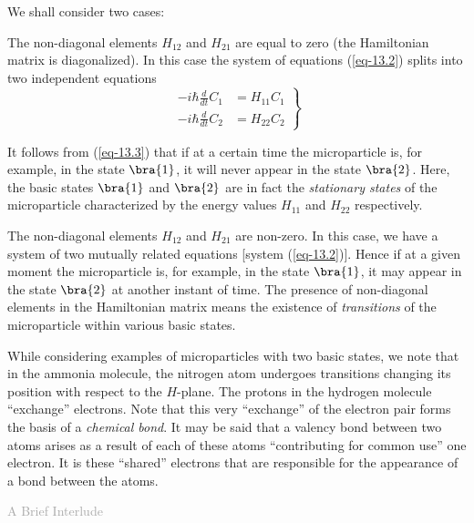 \documentclass[a4paper,sfsidenotes,colorlinks=true]{tufte-book}
\numberwithin{equation}{section}
\numberwithin{figure}{section}
\begin{document}
We shall consider two cases: 
\\[5pt]
\begin{description}[leftmargin=1cm]
\item[First case.] The non-diagonal elements $H_{12}$ and $H_{21}$ are
  equal to zero (the Hamiltonian matrix is diagonalized). In this case
  the system of equations (\ref{eq-13.2}) splits into two independent
  equations
\begin{equation}%
\left.
\begin{split}
- i \hbar \frac{d}{dt} C_{1} & = H_{11}C_{1}  \\
- i \hbar \frac{d}{dt} C_{2} & = H_{22} C_{2} 
\end{split}
\right\}
\label{eq-13.3}
\end{equation}

It follows from (\ref{eq-13.3}) that if at a certain time the
microparticle is, for example, in the state $\bra{1}$, it will never appear
in the state $\bra{2}$. Here, the basic states $\bra{1}$ and $\bra{2}$ are in fact
the \emph{stationary states} of the microparticle characterized by the energy
values $H_{11}$ and $H_{22}$ respectively.

\item[Second case.] The non-diagonal elements $H_{12}$
and $H_{21}$ are non-zero. In this case, we have a system of two mutually
related equations [system (\ref{eq-13.2})]. Hence if at a given moment the
microparticle is, for example, in the state $\bra{1}$, it may appear in the
state  $\bra{2}$ at another instant of time. The presence of non-diagonal
elements in the Hamiltonian matrix means the existence of \emph{transitions}
of the microparticle within various basic states.  
\end{description}

While considering examples of microparticles with two basic states, we
note that in the ammonia molecule, the nitrogen atom undergoes
transitions changing its position with respect to the $H$-plane. The
protons in the hydrogen molecule ``exchange'' electrons. Note that
this very ``exchange'' of the electron pair forms the basis of a
\emph{chemical bond}. It may be said that a valency bond between two
atoms arises as a result of each of these atoms ``contributing for
common use'' one electron. It is these ``shared'' electrons that are
responsible for the appearance of a bond between the atoms.



\clearpage 


\textsf{\Large \textcolor{darkgray}{A Brief Interlude}}
\end{document}
